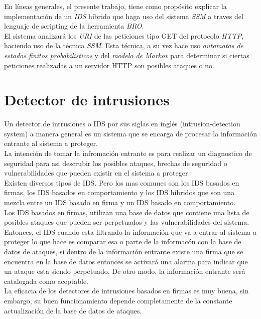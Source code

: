 \documentclass{article}
\begin{document}
En l\'ineas generales, el presente trabajo, tiene como prop\'osito explicar la implementaci\'on de un \textit{IDS} híbrido que haga uso del sistema \textit{SSM} a traves del lenguaje de scripting de la herramienta \textit{BRO}.\\

El sistema analizar\'a los \textit{URI} de las peticiones tipo GET del protocolo \textit{HTTP}, haciendo uso de la t\'ecnica \textit{SSM}. Esta t\'ecnica, a su vez hace uso \textit{automatas de estados finitos probabilisticos} y del \textit{modelo de Markov} para determinar si ciertas peticiones realizadas a un servidor HTTP son posibles ataques o no.


\section{Detector de intrusiones}

Un detector de intrusiones o IDS por sus siglas en ingl\'es (intrusion-detection system) a manera general es un sistema que se encarga de procesar la informaci\'on entrante al sistema a proteger.\\

La intenci\'on de tomar la infromaci\'on entrante es para realizar un diagnostico de seguridad para asi descrubir los posibles ataques, brechas de seguridad o vulnerabilidades que pueden existir en el sistema a proteger.\\

Existen diversos tipos de IDS. Pero los mas comunes son los IDS basados en firmas, los IDS basados en comportamiento y los IDS h\'ibridos que son una mezcla entre un IDS basado en firma y un IDS basado en comportamiento.\\

Los IDS basados en firmas, utilizan una base de datos que contiene una lista de posibles ataques que pueden ser perpetuados y las vulnerabilidades del sistema. Entonces, el IDS cuando esta filtrando la informaci\'on que va a entrar al sistema a proteger lo que hace es comparar esa o parte de la informac\'on con la base de datos de ataques, si dentro de la informaci\'on entrante existe una firma que se encuentra en la base de datos entonces se activar\'a una alarma para indicar que un ataque esta siendo perpetuado. De otro modo, la informaci\'on entrante ser\'a  catalogada como aceptable.\\

La eficacia de los detectores de intrusiones basados en firmas es muy buena, sin embargo, su buen funcionamiento depende completamente de la constante actualización de la base de datos de ataques.\\
\end{document}
